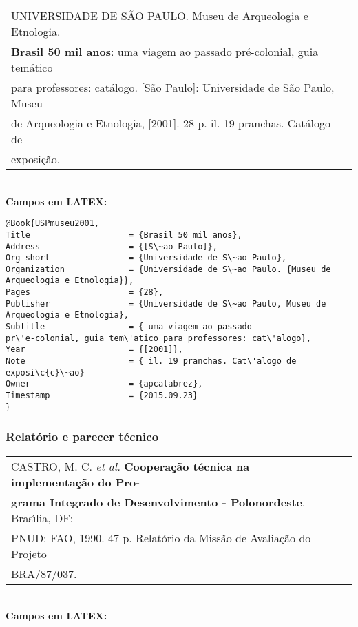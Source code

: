 \begin{tabular}{|l|c|} \hline
	UNIVERSIDADE DE S\~AO PAULO. Museu de Arqueologia e Etnologia.  \\ \textbf{Brasil 50 mil anos}: uma viagem ao passado pr\'e-colonial, guia tem\'atico \\ para professores: cat\'alogo. [S\~ao Paulo]: Universidade de S\~ao Paulo, Museu \\ de
	Arqueologia e Etnologia, [2001]. 28 p. il. 19 pranchas. Cat\'alogo de \\ exposi\c{c}\~ao.   \\\hline
\end{tabular}\\

\textbf{Campos em LATEX:}

\begin{verbatim}
@Book{USPmuseu2001,
Title                    = {Brasil 50 mil anos},
Address                  = {[S\~ao Paulo]},
Org-short                = {Universidade de S\~ao Paulo},
Organization             = {Universidade de S\~ao Paulo. {Museu de 
Arqueologia e Etnologia}},
Pages                    = {28},
Publisher                = {Universidade de S\~ao Paulo, Museu de 
Arqueologia e Etnologia},
Subtitle                 = { uma viagem ao passado
pr\'e-colonial, guia tem\'atico para professores: cat\'alogo},
Year                     = {[2001]},
Note                     = { il. 19 pranchas. Cat\'alogo de exposi\c{c}\~ao}
Owner                    = {apcalabrez},
Timestamp                = {2015.09.23}
}
\end{verbatim}

\subsubsection{Relat\'orio e parecer t\'ecnico}

\begin{tabular}{|l|c|} \hline
	CASTRO, M. C. \textit{et al.} \textbf{Coopera\c{c}\~ao t\'ecnica na implementa\c{c}\~ao do
		Pro-}\\\textbf{grama Integrado de Desenvolvimento - Polonordeste}. Bras\'{\i}lia, DF: \\ PNUD: FAO, 1990. 47 p. Relat\'orio da Miss\~ao de Avalia\c{c}\~ao do Projeto \\ BRA/87/037.     \\\hline
\end{tabular}\\

\textbf{Campos em LATEX:}

